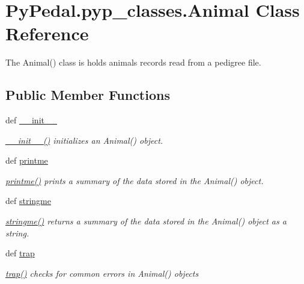 \hypertarget{classPyPedal_1_1pyp__classes_1_1Animal}{
\section{PyPedal.pyp\_\-classes.Animal Class Reference}
\label{classPyPedal_1_1pyp__classes_1_1Animal}
}


The Animal() class is holds animals records read from a pedigree file.  


\subsection*{Public Member Functions}
\begin{DoxyCompactItemize}
\item 
def \hyperlink{classPyPedal_1_1pyp__classes_1_1Animal_a70faad62bca4ba5416716e9e80ac1f4b}{\_\-\_\-init\_\-\_\-}
\begin{DoxyCompactList}\small\item\em \hyperlink{classPyPedal_1_1pyp__classes_1_1Animal_a70faad62bca4ba5416716e9e80ac1f4b}{\_\-\_\-init\_\-\_\-()} initializes an Animal() object. \item\end{DoxyCompactList}\item 
def \hyperlink{classPyPedal_1_1pyp__classes_1_1Animal_af51068dab30eb24722552cf6bb41c287}{printme}
\begin{DoxyCompactList}\small\item\em \hyperlink{classPyPedal_1_1pyp__classes_1_1Animal_af51068dab30eb24722552cf6bb41c287}{printme()} prints a summary of the data stored in the Animal() object. \item\end{DoxyCompactList}\item 
def \hyperlink{classPyPedal_1_1pyp__classes_1_1Animal_ac3daf931dff355bfae652a95b41d0503}{stringme}
\begin{DoxyCompactList}\small\item\em \hyperlink{classPyPedal_1_1pyp__classes_1_1Animal_ac3daf931dff355bfae652a95b41d0503}{stringme()} returns a summary of the data stored in the Animal() object as a string. \item\end{DoxyCompactList}\item 
def \hyperlink{classPyPedal_1_1pyp__classes_1_1Animal_addb9409a4949f8317cf69313bbd0bd91}{trap}
\begin{DoxyCompactList}\small\item\em \hyperlink{classPyPedal_1_1pyp__classes_1_1Animal_addb9409a4949f8317cf69313bbd0bd91}{trap()} checks for common errors in Animal() objects \item\end{DoxyCompactList}\item 

\end{DoxyCompactItemize}
